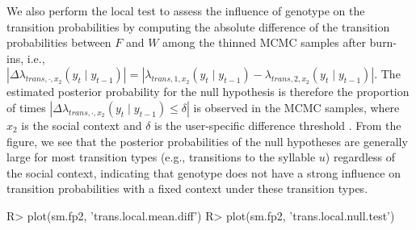 We also perform the local test  to assess the influence of genotype on the transition probabilities by computing the absolute difference of the transition probabilities between $F$ and $W$ among the thinned MCMC samples after burn-ins, i.e., $|\Delta \lambda_{trans,\cdot,x_2}(y_t\mid y_{t-1})|=|\lambda_{trans,1,x_2}(y_t\mid y_{t-1})-\lambda_{trans,2,x_2}(y_t\mid y_{t-1})|$. 
The estimated posterior probability for the null hypothesis is therefore the proportion of times $|\Delta \lambda_{trans,\cdot,x_2}(y_t\mid y_{t-1}) \le \delta|$ is observed in the MCMC samples, 
where $x_2$ is the social context and $\delta$ is the user-specific difference threshold . 
{From the figure, we see that the posterior probabilities of the null hypotheses are generally large for most transition types (e.g., transitions to the syllable $u$) regardless of the social context, 
indicating that genotype does not have a strong influence on transition probabilities with a fixed context under these transition types. }

\begin{example}
R> plot(sm.fp2, 'trans.local.mean.diff')
R> plot(sm.fp2, 'trans.local.null.test')
\end{example}

